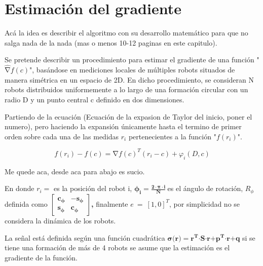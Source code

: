 \newpage
\thispagestyle{empty}
\mbox{}

\chapter{Estimación del gradiente}
\label{ch:chapter3}

Acá la idea es describir el algoritmo con su desarrollo matemático para que no salga nada de la nada (mas o menos 10-12 paginas en este capitulo).

Se pretende describir un procedimiento para estimar el gradiente de una función "$\widehat{\mathrm{\nabla }}{f}\left(c\right)$", basándose en mediciones locales de múltiples robots situados de manera simétrica en un espacio de 2D. En dicho procedimiento, se consideran N robots distribuidos uniformemente a lo largo de una formación circular con un radio D y un punto central c definido en dos dimensiones.

Partiendo de la ecuación (Ecuación de la expasion de Taylor del inicio, poner el numero), pero haciendo la expansión únicamente hasta el termino de primer orden sobre cada una de las medidas $r_i$ pertenecientes a la función "${f}\left({r}_{i}\right)$".

\begin{equation*}
	f\left(r_{i}\right)-f\left(c\right)=\mathrm{\nabla}{f}\left(c\right)^{T}\left(r_{i}-c\right)+\varphi_{i}\left(D,c\right)
\end{equation*}

Me quede aca, desde aca para abajo es sucio.

En donde $r_{i}=$ es la posición del robot i, ${\boldsymbol{\phi }}_{\boldsymbol{i}}\boldsymbol{=}\frac{\boldsymbol{2}\cdot\boldsymbol{\pi }\cdot\boldsymbol{i}}{\boldsymbol{N}}\boldsymbol{\ }$es el ángulo de rotación, $R_{\phi }$  definida como \textbf{ }$\left[ \begin{array}{cc} {\boldsymbol{c}}_{\boldsymbol{\phi }} & \boldsymbol{-}{\boldsymbol{s}}_{\boldsymbol{\phi }} \\  {\boldsymbol{s}}_{\boldsymbol{\phi }} & {\boldsymbol{c}}_{\boldsymbol{\phi }} \end{array} \right]$\textbf{, }finalmente $e\ =\ {\left[1,0\right]}^T$, por simplicidad no se considera la dinámica de los robots.



\noindent La señal está definida según una función cuadrática $\boldsymbol{\sigma }\boldsymbol{(}\boldsymbol{r}\boldsymbol{)=}{\boldsymbol{r}}^{\boldsymbol{T}}\boldsymbol{\cdot}\boldsymbol{S}\boldsymbol{\cdot}\boldsymbol{r}\boldsymbol{+}{\boldsymbol{p}}^{\boldsymbol{T}}\boldsymbol{\cdot}\boldsymbol{r}\boldsymbol{+}\boldsymbol{q}$ si se tiene una formación de más de 4 robots se asume que la estimación es el gradiente de la función.

